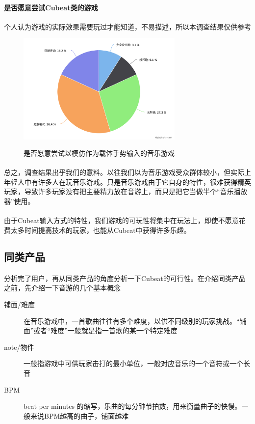 \documentclass{article} \usepackage{CJK}
\begin{document}
\paragraph{是否愿意尝试Cubeat类的游戏}
\paragraph{}
个人认为游戏的实际效果需要玩过才能知道，不易描述，所以本调查结果仅供参考
\begin{figure}[H]
  \centering
  \includegraphics[width=22em]{chart5.png}\\
  \caption{是否愿意尝试以模仿作为载体手势输入的音乐游戏}\label{2-5}
\end{figure}
\paragraph{}
总之，调查结果出乎我们的意料。以往我们以为音乐游戏受众群体较小，但实际上年轻人中有许多人在玩音乐游戏。只是音乐游戏由于它自身的特性，很难获得精英玩家，导致许多玩家没有把主要精力放在音游上，而只是把它当做半个“音乐播放器”使用。
\paragraph{}
由于Cubeat输入方式的特性，我们游戏的可玩性将集中在玩法上，即使不愿意花费太多时间提高技术的玩家，也能从Cubeat中获得许多乐趣。
\subsection{同类产品}
\paragraph{}
分析完了用户，再从同类产品的角度分析一下Cubeat的可行性。在介绍同类产品之前，先介绍一下音游的几个基本概念
\begin{description}
  \item[铺面/难度] 在音乐游戏中，一首歌曲往往有多个难度，以供不同级别的玩家挑战。“铺面”或者“难度”一般就是指一首歌的某一个特定难度
  \item[note/物件] 一般指游戏中可供玩家击打的最小单位，一般对应音乐的一个音符或一个长音
  \item[BPM] beat per minutes 的缩写，乐曲的每分钟节拍数，用来衡量曲子的快慢。一般来说BPM越高的曲子，铺面越难
\end{description}
\end{document}
